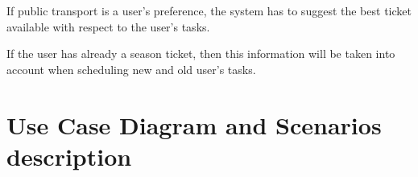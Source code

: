 \begin{requirementList}
    \item If public transport is a user's preference, the system has to suggest the best ticket available with respect to the user's tasks. 
    \begin{enumerate}[label={[}R 18.\arabic*{]}:]
    \item If the user has already a season ticket, then this information will be taken into account when scheduling new and old user's tasks.
    \end{enumerate}

\end{requirementList}

\section{Use Case Diagram and Scenarios description}









